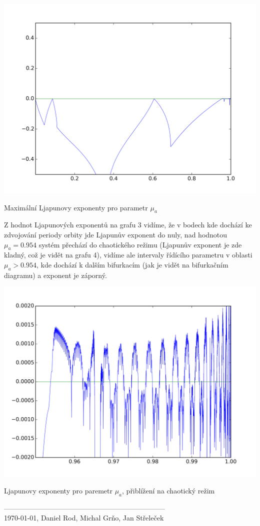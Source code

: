 \documentclass[a4paper, 12pt]{article}
\begin{document}
\begin{graph}[H]
	\centering
\includegraphics[width=\textwidth]{grafy/mua_f_wid.png}
\vspace{-10pt}
\caption{Maximální Ljapunovy exponenty pro parametr $\mu_a$}
\label{fig:lyapunov_mua}
\end{graph}

Z hodnot Ljapunových exponentů na grafu 3 vidíme, že v bodech kde dochází ke zdvojování periody orbity jde Ljapunův exponent do nuly, nad hodnotou $\mu_a=0.954$ systém přechází do chaotického režimu (Ljapunův exponent je zde kladný, což je vidět na grafu 4), vidíme ale intervaly řídícího parametru v oblasti $\mu_a > 0.954$, kde dochází k dalším bifurkacím (jak je vidět na bifurkačním diagramu) a exponent je záporný.

\begin{graph}[H]
	\centering
\includegraphics[width=\textwidth]{grafy/mua.png}
\vspace{-10pt}
\caption{Ljapunovy exponenty pro paremetr $\mu_a$, přiblížení na chaotický režim}
\label{fig:lyapunov_mua_zoom}
\end{graph}

---------------------------------------------------------------------\\
\today, Daniel Rod, Michal Grňo, Jan Střeleček
\end{document}
